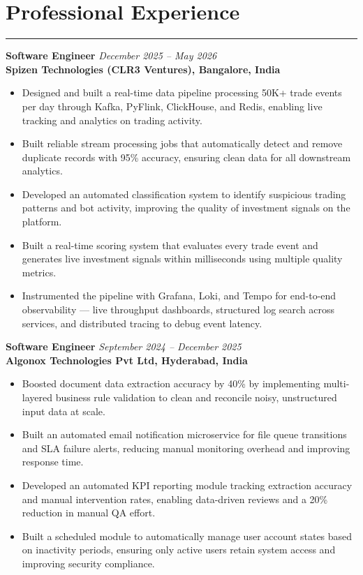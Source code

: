 \documentclass[10pt]{article}
\begin{document}
\section*{Professional Experience}
\vspace{1pt}\hrule\vspace{4pt}

\textbf{Software Engineer} \hfill \textit{December 2025 -- May 2026} \\
\textbf{Spizen Technologies (CLR3 Ventures), Bangalore, India}
\begin{itemize}
  \item Designed and built a real-time data pipeline processing 50K+ trade events per day through Kafka, PyFlink, ClickHouse, and Redis, enabling live tracking and analytics on trading activity.
  \item Built reliable stream processing jobs that automatically detect and remove duplicate records with 95\% accuracy, ensuring clean data for all downstream analytics.
  \item Developed an automated classification system to identify suspicious trading patterns and bot activity, improving the quality of investment signals on the platform.
  \item Built a real-time scoring system that evaluates every trade event and generates live investment signals within milliseconds using multiple quality metrics.
  \item Instrumented the pipeline with Grafana, Loki, and Tempo for end-to-end observability — live throughput dashboards, structured log search across services, and distributed tracing to debug event latency.
\end{itemize}

\textbf{Software Engineer} \hfill \textit{September 2024 -- December 2025} \\
\textbf{Algonox Technologies Pvt Ltd, Hyderabad, India}
\begin{itemize}
  \item Boosted document data extraction accuracy by 40\% by implementing multi-layered business rule validation to clean and reconcile noisy, unstructured input data at scale.
  \item Built an automated email notification microservice for file queue transitions and SLA failure alerts, reducing manual monitoring overhead and improving response time.
  \item Developed an automated KPI reporting module tracking extraction accuracy and manual intervention rates, enabling data-driven reviews and a 20\% reduction in manual QA effort.
  \item Built a scheduled module to automatically manage user account states based on inactivity periods, ensuring only active users retain system access and improving security compliance.
\end{itemize}
\end{document}
